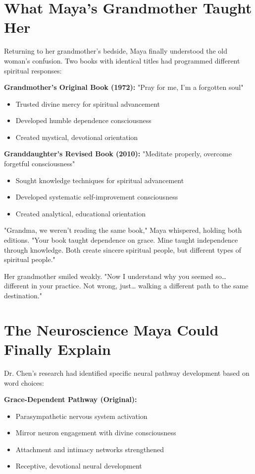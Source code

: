 \documentclass[11pt,twoside]{book}
\begin{document}
\section*{What Maya's Grandmother Taught Her}
\label{sec:orgcdc8cb3}

Returning to her grandmother's bedside, Maya finally understood the old woman's confusion. Two books with identical titles had programmed different spiritual responses:

\textbf{\textbf{Grandmother's Original Book (1972):}}
"Pray for me, I'm a forgotten soul"
\begin{itemize}
\item Trusted divine mercy for spiritual advancement
\item Developed humble dependence consciousness
\item Created mystical, devotional orientation
\end{itemize}

\textbf{\textbf{Granddaughter's Revised Book (2010):}}
"Meditate properly, overcome forgetful consciousness"  
\begin{itemize}
\item Sought knowledge techniques for spiritual advancement
\item Developed systematic self-improvement consciousness
\item Created analytical, educational orientation
\end{itemize}

"Grandma, we weren't reading the same book," Maya whispered, holding both editions. "Your book taught dependence on grace. Mine taught independence through knowledge. Both create sincere spiritual people, but different types of spiritual people."

Her grandmother smiled weakly. "Now I understand why you seemed so\ldots{} different in your practice. Not wrong, just\ldots{} walking a different path to the same destination."
\section*{The Neuroscience Maya Could Finally Explain}
\label{sec:org4bb5e1e}

Dr. Chen's research had identified specific neural pathway development based on word choices:

\textbf{\textbf{Grace-Dependent Pathway (Original):}}
\begin{itemize}
\item Parasympathetic nervous system activation
\item Mirror neuron engagement with divine consciousness
\item Attachment and intimacy networks strengthened
\item Receptive, devotional neural development
\end{itemize}
\end{document}

